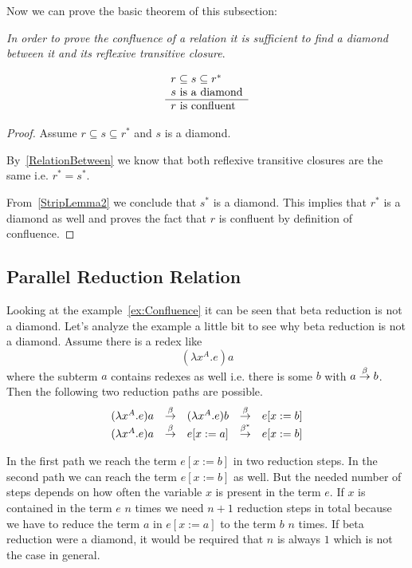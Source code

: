 Now we can prove the basic theorem of this subsection:

\begin{theorem}
    \label{DiamondBetween}
    \emph{In order to prove the confluence of a relation it is sufficient to
    find a diamond between it and its reflexive transitive closure}.

    $$
    \begin{array}{l} 
        r \subseteq s \subseteq r^*
        \\
        s \text{ is a diamond}
     \\ \hline 
        r \text{ is confluent}
    \end{array}
    $$

    \begin{proof}
        Assume $r \subseteq s \subseteq r^*$ and $s$ is a diamond.

        By~\ref{RelationBetween} we know that both reflexive transitive closures
        are the same i.e. $r^* = s^*$.

        From~\ref{StripLemma2} we conclude that $s^*$ is a diamond. This implies
        that $r^*$ is a diamond as well and proves the fact that $r$ is
        confluent by definition of confluence.
    \end{proof}
\end{theorem}










\subsection{Parallel Reduction Relation}

Looking at the example~\ref{ex:Confluence} it can be seen that beta reduction is
not a diamond. Let's analyze the example a little bit to see why beta reduction
is not a diamond. Assume there is a redex like
$$
    (\lambda x^A. e) a
$$
where the subterm $a$ contains redexes as well i.e. there is some $b$ with $a
\stackrel{\beta}{\to} b$. Then the following two reduction paths are possible.
$$
\begin{array}{lllll}
    (\lambda x^A. e) a
    &\stackrel{\beta}{\to}& (\lambda x^A. e) b
    &\stackrel{\beta}{\to}& e[x:=b]
    \\
    (\lambda x^A. e) a
    &\stackrel{\beta}{\to}& e[x:=a]
    &\stackrel{\beta^*}{\to}& e[x:=b]
\end{array}
$$

In the first path we reach the term $e[x:=b]$ in two reduction steps. In the
second path we can reach the term $e[x:=b]$ as well. But the needed number of
steps depends on how often the variable $x$ is present in the term $e$. If $x$
is contained in the term $e$ $n$ times we need $n+1$ reduction steps in total
because we have to reduce the term $a$ in $e[x:=a]$ to the term $b$ $n$ times.
If beta reduction were a diamond, it would be required that $n$ is always $1$
which is not the case in general.

